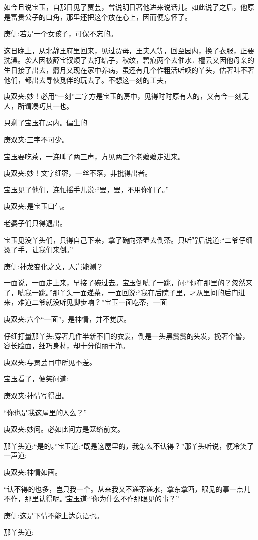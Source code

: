 \begin{parag}
    如今且说宝玉，自那日见了贾芸，曾说明日著他进来说话儿。如此说了之后，他原是富贵公子的口角，那里还把这个放在心上，因而便忘怀了。\begin{note}庚侧:若是一个女孩子，可保不忘的。\end{note}这日晚上，从北静王府里回来，见过贾母，王夫人等，回至园内，换了衣服，正要洗澡。袭人因被薛宝钗烦了去打结子，秋纹，碧痕两个去催水，檀云又因他母亲的生日接了出去，麝月又现在家中养病，虽还有几个作粗活听唤的丫头，估著叫不著他们，都出去寻伙觅伴的玩去了。不想这一刻的工夫，\begin{note}庚双夹:妙！必用“一刻”二字方是宝玉的房中，见得时时原有人的，又有今一刻无人，所谓凑巧其一也。\end{note}只剩了宝玉在房内。偏生的\begin{note}庚双夹:三字不可少。\end{note}宝玉要吃茶，一连叫了两三声，方见两三个老嬷嬷走进来。\begin{note}庚双夹:妙！文字细密，一丝不落，非批得出者。\end{note}宝玉见了他们，连忙摇手儿说:“罢，罢，不用你们了。”\begin{note}庚双夹:是宝玉口气。\end{note}老婆子们只得退出。
\end{parag}


\begin{parag}
    宝玉见没丫头们，只得自己下来，拿了碗向茶壶去倒茶。只听背后说道:“二爷仔细烫了手，让我们来倒。”\begin{note}庚侧:神龙变化之文，人岂能测？\end{note}一面说，一面走上来，早接了碗过去。宝玉倒唬了一跳，问:“你在那里的？忽然来了，唬我一跳。”那丫头一面递茶，一面回说:“我在后院子里，才从里间的后门进来，难道二爷就没听见脚步响？”宝玉一面吃茶，一面\begin{note}庚双夹:六个“一面”，是神情，并不觉厌。\end{note}仔细打量那丫头:穿著几件半新不旧的衣裳，倒是一头黑鬒鬒的头发，挽著个髻，容长脸面，细巧身材，却十分俏丽干净。\begin{note}庚双夹:与贾芸目中所见不差。\end{note}宝玉看了，便笑问道:\begin{note}庚双夹:神情写得出。\end{note}“你也是我这屋里的人么？”\begin{note}庚双夹:妙问。必如此问方是笼络前文。\end{note}那丫头道:“是的。”宝玉道:“既是这屋里的，我怎么不认得？”那丫头听说，便冷笑了一声道:\begin{note}庚双夹:神情如画。\end{note}“认不得的也多，岂只我一个。从来我又不递茶递水，拿东拿西，眼见的事一点儿不作，那里认得呢。”宝玉道:“你为什么不作那眼见的事？”\begin{note}庚侧:这是下情不能上达意语也。\end{note}那丫头道:
\end{parag}



